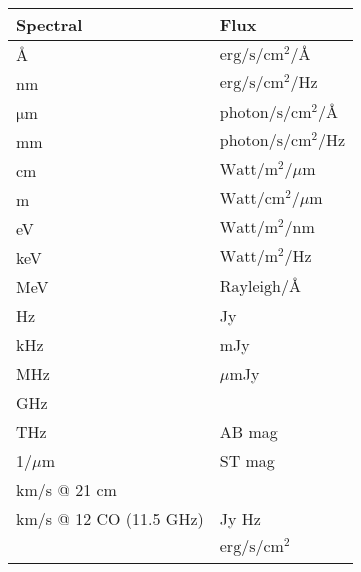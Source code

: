 \begin{table}
    \begin{tabular}{ll}
    \toprule
    Spectral                & Flux \\
    \midrule
    \mbox{\AA}              & $\mathrm{erg}/\mathrm{s}/\mathrm{cm}^{2}/\mbox{\AA}$     \\
    nm                      & $\mathrm{erg}/\mathrm{s}/\mathrm{cm}^{2}/\mathrm{Hz}$    \\
    $\mathrm{\mu}$m         & $\mathrm{photon}/\mathrm{s}/\mathrm{cm}^{2}/\mbox{\AA}$  \\
    mm                      & $\mathrm{photon}/\mathrm{s}/\mathrm{cm}^{2}/\mathrm{Hz}$ \\
    cm                      & $\mathrm{Watt}/\mathrm{m}^{2}/{\mu}\mathrm{m}$           \\
    m                       & $\mathrm{Watt}/\mathrm{cm}^{2}/\mu\mathrm{m}$            \\
    eV                      & $\mathrm{Watt}/\mathrm{m}^{2}/\mathrm{nm}$               \\
    keV                     & $\mathrm{Watt}/\mathrm{m}^{2}/\mathrm{Hz}$               \\
    MeV                     & $\mathrm{Rayleigh}/\mbox{\AA}$                           \\
    Hz                      & Jy                									   \\
    kHz                     & mJy               									   \\
    MHz                     & ${\mu}$mJy             								   \\
    GHz                     & ~                 									   \\
    THz                     & AB mag           										   \\
    1/${\mu}$m              & ST mag             									   \\
    km/s @ 21 cm            & ~               										   \\
    km/s @ 12 CO (11.5 GHz) & Jy Hz             									   \\
    ~ 					    & $\mathrm{erg}/\mathrm{s}/\mathrm{cm}^{2}$                \\
    \bottomrule
    \end{tabular}
\end{table}